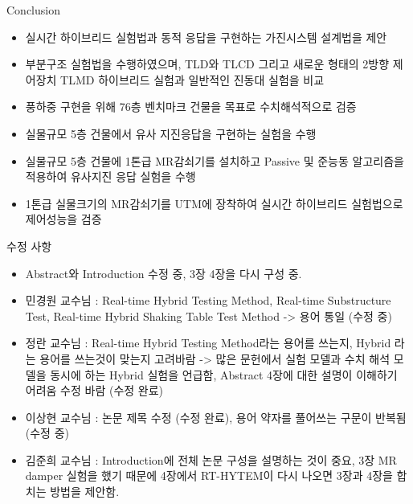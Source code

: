 \documentclass[usepdftitle=false]{beamer}
\begin{document}
\begin{frame}{Conclusion}
\begin{itemize}
   \item 실시간 하이브리드 실험법과 동적 응답을 구현하는 가진시스템 설계법을 제안
   \item 부분구조 실험법을 수행하였으며, TLD와 TLCD 그리고 새로운 형태의 2방향 제어장치 TLMD 하이브리드 실험과 일반적인 진동대 실험을 비교
   \item 풍하중 구현을 위해 76층 벤치마크 건물을 목표로 수치해석적으로 검증
   \item 실물규모 5층 건물에서 유사 지진응답을 구현하는 실험을 수행
   \item 실물규모 5층 건물에 1톤급 MR감쇠기를 설치하고 Passive 및 준능동 알고리즘을 적용하여 유사지진 응답 실험을 수행
   \item 1톤급 실물크기의 MR감쇠기를 UTM에 장착하여 실시간 하이브리드 실험법으로 제어성능을 검증
\end{itemize}
\end{frame}



\begin{frame}{수정 사항}
\begin{itemize}
   \item Abstract와 Introduction 수정 중, 3장 4장을 다시 구성 중.
   \item 민경원 교수님 : Real-time Hybrid Testing Method, Real-time Substructure Test, Real-time Hybrid Shaking Table Test Method -> 용어 통일 (수정 중)
   \item 정란 교수님 : Real-time Hybrid Testing Method라는 용어를 쓰는지, Hybrid 라는 용어를 쓰는것이 맞는지 고려바람 -> 많은 문헌에서 실험 모델과 수치 해석 모델을 동시에 하는 Hybrid 실험을 언급함, Abstract 4장에 대한 설명이 이해하기 어려움 수정 바람 (수정 완료)
   \item 이상현 교수님 : 논문 제목 수정 (수정 완료), 용어 약자를 풀어쓰는 구문이 반복됨 (수정 중)
   \item 김준희 교수님 : Introduction에 전체 논문 구성을 설명하는 것이 중요, 3장 MR damper 실험을 했기 때문에 4장에서 RT-HYTEM이 다시 나오면 3장과 4장을 합치는 방법을 제안함.
\end{itemize}
\end{frame}
\end{document}
